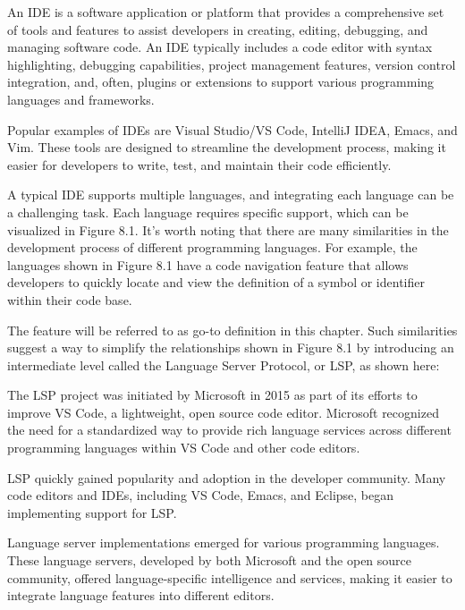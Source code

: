 An IDE is a software application or platform that provides a comprehensive set of tools and features to assist developers in creating, editing, debugging, and managing software code. An IDE typically includes a code editor with syntax highlighting, debugging capabilities, project management features, version control integration, and, often, plugins or extensions to support various programming languages and frameworks.

Popular examples of IDEs are Visual Studio/VS Code, IntelliJ IDEA, Emacs, and Vim. These tools are designed to streamline the development process, making it easier for developers to write, test, and maintain their code efficiently.

A typical IDE supports multiple languages, and integrating each language can be a challenging task. Each language requires specific support, which can be visualized in Figure 8.1. It's worth noting that there are many similarities in the development process of different programming languages. For example, the languages shown in Figure 8.1 have a code navigation feature that allows developers to quickly locate and view the definition of a symbol or identifier within their code base.


The feature will be referred to as go-to definition in this chapter. Such similarities suggest a way to simplify the relationships shown in Figure 8.1 by introducing an intermediate level called the Language Server Protocol, or LSP, as shown here:


The LSP project was initiated by Microsoft in 2015 as part of its efforts to improve VS Code, a lightweight, open source code editor. Microsoft recognized the need for a standardized way to provide rich language services across different programming languages within VS Code and other code editors.

LSP quickly gained popularity and adoption in the developer community. Many code editors and IDEs, including VS Code, Emacs, and Eclipse, began implementing support for LSP.

Language server implementations emerged for various programming languages. These language servers, developed by both Microsoft and the open source community, offered language-specific intelligence and services, making it easier to integrate language features into different editors.

